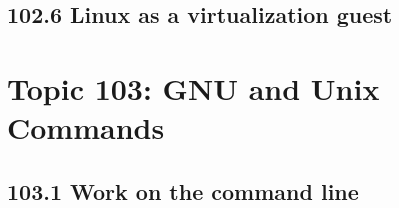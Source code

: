 \documentclass[12pt,a4paper]{report}
\begin{document}





\section*{102.6 Linux as a virtualization guest}




\chapter{Topic 103: GNU and Unix Commands}


\section*{103.1 Work on the command line}


\end{document}
